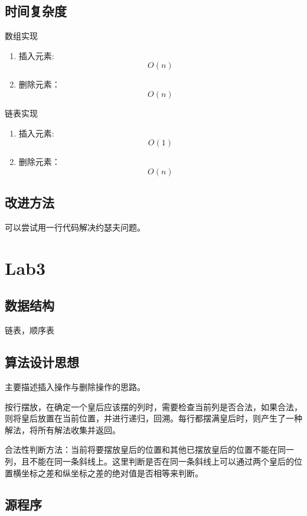 \documentclass[a4paper,11pt,UTF8]{ctexart}
\begin{document}
\subsection{时间复杂度}
数组实现\par
\begin{enumerate}
    \item 插入元素: $$O(n)$$
    \item 删除元素：$$O(n)$$
\end{enumerate}\par

链表实现\par

\begin{enumerate}
    \item 插入元素: $$O(1)$$
    \item 删除元素：$$O(n)$$
\end{enumerate}\par

\subsection{改进方法}
可以尝试用一行代码解决约瑟夫问题。

\section{Lab3}
\subsection{数据结构}
链表，顺序表
\subsection{算法设计思想}
主要描述插入操作与删除操作的思路。\par

按行摆放，在确定一个皇后应该摆的列时，需要检查当前列是否合法，如果合法，则将皇后放置在当前位置，并进行递归，回溯。每行都摆满皇后时，则产生了一种解法，将所有解法收集并返回。\par
合法性判断方法：当前将要摆放皇后的位置和其他已摆放皇后的位置不能在同一列，且不能在同一条斜线上。这里判断是否在同一条斜线上可以通过两个皇后的位置横坐标之差和纵坐标之差的绝对值是否相等来判断。\par
\subsection{源程序}
\end{document}

